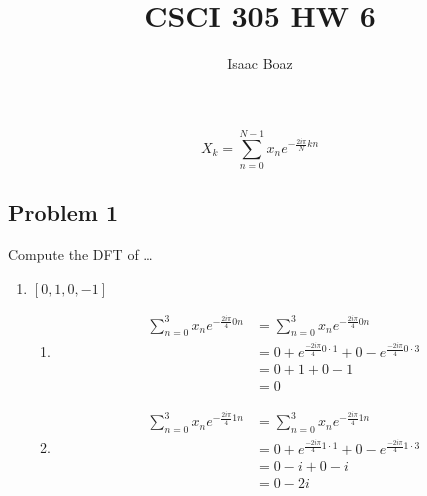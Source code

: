 \documentclass{article}
\title{CSCI 305 HW 6}
\author{Isaac Boaz}
\begin{document}
\maketitle

\begin{equation*}
    X_k = \sum_{n=0}^{N-1} x_n e^{-\frac{2i \pi}{N}kn}
\end{equation*}

\subsection*{Problem 1}

Compute the DFT of \dots

\begin{enumerate}[label=\Alph*)]
    \item \([0, 1, 0, -1]\)
          \begin{enumerate}[label={k=\arabic*}, start=0]
              \item \begin{align*}
                        \sum_{n=0}^{3}{x_n e^{-\frac{2 i \pi}{4}0n}} & = \sum_{n=0}^{3}{x_n e^{-\frac{2 i \pi}{4}0n}}                                \\
                                                                     & = 0 + e^{\frac{-2 i \pi}{4} 0 \cdot 1} + 0 - e^{\frac{-2 i \pi}{4} 0 \cdot 3} \\
                                                                     & = 0 + 1 + 0 - 1                                                               \\
                                                                     & = 0
                    \end{align*}
              \item \begin{align*}
                        \sum_{n=0}^{3}{x_n e^{-\frac{2 i \pi}{4}1n}} & = \sum_{n=0}^{3}{x_n e^{-\frac{2 i \pi}{4}1n}}                                \\
                                                                     & = 0 + e^{\frac{-2 i \pi}{4} 1 \cdot 1} + 0 - e^{\frac{-2 i \pi}{4} 1 \cdot 3} \\
                                                                     & = 0 - i + 0 - i                                                               \\
                                                                     & = 0 -2i
                    \end{align*}

\end{enumerate}
\end{enumerate}
\end{document}
